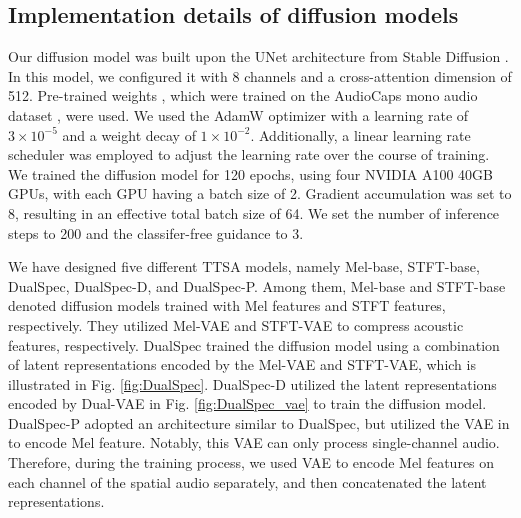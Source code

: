 \documentclass{IEEEtran}
\begin{document}
\subsection{Implementation details of diffusion models}
\label{subsec: Implementation details of diffusion models}
Our diffusion model was built upon the UNet architecture from Stable Diffusion \cite{rombach2022high}. In this model, we configured it with 8 channels and a cross-attention dimension of 512. Pre-trained weights \cite{majumder2024tango}, which were trained on the AudioCaps mono audio dataset \cite{kim2019audiocaps}, were used. We used the AdamW optimizer \cite{loshchilov2017fixing} with a learning rate of $3 \times 10^{-5}$ and a weight decay of $1 \times 10^{-2}$. Additionally, a linear learning rate scheduler \cite{li2019budgeted} was employed to adjust the learning rate over the course of training. We trained the diffusion model for 120 epochs, using four NVIDIA A100 40GB GPUs, with each GPU having a batch size of 2. Gradient accumulation was set to 8, resulting in an effective total batch size of 64. We set the number of inference steps to 200 and the classifer-free guidance to 3.

{We have designed five different TTSA models, namely Mel-base, STFT-base, DualSpec, DualSpec-D, and DualSpec-P. Among them, Mel-base and STFT-base denoted diffusion models trained with Mel features and STFT features, respectively. They utilized Mel-VAE and STFT-VAE to compress acoustic features, respectively. DualSpec trained the diffusion model using a combination of latent representations encoded by the Mel-VAE and STFT-VAE, which is illustrated in Fig. \ref{fig:DualSpec}. DualSpec-D utilized the latent representations encoded by Dual-VAE in Fig. \ref{fig:DualSpec_vae} to train the diffusion model. DualSpec-P adopted an architecture similar to DualSpec, but utilized the VAE in \cite{liu2023audioldm} to encode Mel feature. Notably, this VAE can only process single-channel audio. Therefore, during the training process, we used VAE to encode Mel features on each channel of the spatial audio separately, and then concatenated the latent representations.}
\end{document}
